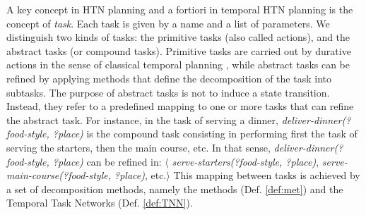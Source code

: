 \documentclass[letterpaper]{article} %
\begin{document}


 A key concept in HTN planning and a fortiori in temporal HTN planning is the concept of {\it task}. Each task is given by a name and a list of parameters. We distinguish two kinds of tasks: the  primitive tasks (also called actions), and the abstract tasks (or compound tasks).
 Primitive tasks are carried out by  durative actions in the sense of classical temporal planning \cite{fox03}, while abstract tasks can be refined by applying methods that define the decomposition of the task into subtasks. The purpose of abstract tasks is not to induce a state transition. Instead, they refer to a predefined mapping to one or more tasks that can refine the abstract task. For instance, in the task of serving a dinner, {\it deliver-dinner(?food-style, ?place)} is the compound task consisting in performing first the task of serving the starters, then the main course, etc. In that sense,  {\it deliver-dinner(?food-style, ?place)} can be refined in: $\langle$ {\it serve-starters(?food-style, ?place)},  {\it serve-main-course(?food-style, ?place)}, etc.$\rangle$ This mapping between tasks is achieved by a set of decomposition methods, namely the methods (Def. \ref{def:met}) and the Temporal Task Networks (Def. \ref{def:TNN}).%


\end{document}
